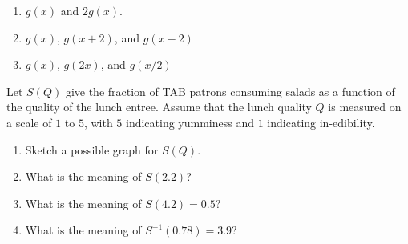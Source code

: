 \documentclass[12pt]{article}
\begin{document}
\begin{enumerate}

\item $g(x)$ and $2g(x)$.

\item $g(x)$, $g(x+2)$, and $g(x-2)$

\item $g(x)$, $g(2x)$, and $g(x/2)$

\end{enumerate}
\newpage
Let $S(Q)$ give the fraction of TAB patrons consuming salads as a
function of the quality of the lunch entree.  Assume that the  
lunch quality $Q$ is measured on a scale of $1$ to $5$, with $5$
indicating yumminess and $1$ indicating in-edibility.  
\begin{enumerate}
  \setlength{\itemsep}{-1mm}
  \item Sketch a possible graph for $S(Q)$.
  \item What is the meaning of $S(2.2)$? 
  \item What is the meaning of $S(4.2) = 0.5$?
  \item What is the meaning of $S^{-1}(0.78) = 3.9$? 
  \end{enumerate}
\end{document}
